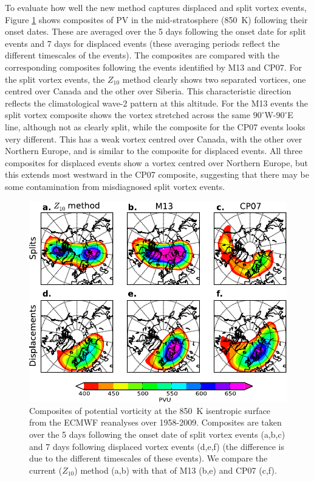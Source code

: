 To evaluate how well the new method captures displaced and split vortex events,
Figure \ref{Fig3} shows composites of PV in the mid-stratosphere (850~K)
following their onset dates. These are averaged over the 5 days following the
onset date for split events and 7 days for displaced events (these averaging
periods reflect the different timescales of the events). The composites are
compared with the corresponding composites following the events identified by
M13 and CP07. For the split vortex events, the $Z_{10}$ method clearly shows two
separated vortices, one centred over Canada and the other over Siberia. This
characteristic direction reflects the climatological wave-2 pattern at this
altitude. For the M13 events the split vortex composite shows the vortex
stretched across the same $90^{\circ}$W-$90^{\circ}$E line, although not as
clearly split, while the composite for the CP07 events looks very
different. This has a weak vortex centred over Canada, with the other over
Northern Europe, and is similar to the composite for displaced events. All three
composites for displaced events show a vortex centred over Northern Europe, but
this extends most westward in the CP07 composite, suggesting that there may be
some contamination from misdiagnosed split vortex events.
\begin{figure}
 \centering
 \noindent\includegraphics[width=\textwidth]{figures/chapter-moments/pv_composites_colbar_crop.pdf}
 \caption[PV composites for split and displaced vortex events.]{Composites of
   potential vorticity at the 850~K isentropic surface from the ECMWF reanalyses
   over 1958-2009. Composites are taken over the 5 days following the onset date
   of split vortex events (a,b,c) and 7 days following displaced vortex events
   (d,e,f) (the difference is due to the different timescales of these
   events). We compare the current ($Z_{10}$) method (a,b) with that of M13
   (b,e) and CP07 (c,f).}
 \label{Fig3}
 \end{figure}

